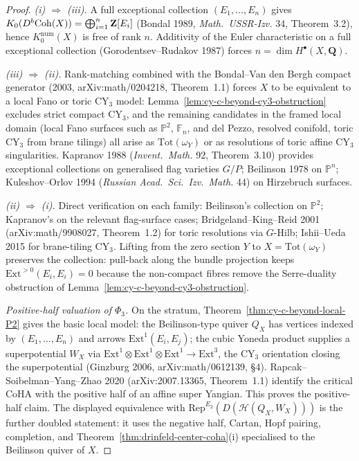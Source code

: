 \begin{proof}
\emph{(i) $\Rightarrow$ (iii).} A full exceptional collection
$(E_1, \ldots, E_n)$ gives $K_0(D^b\mathrm{Coh}(X)) = \bigoplus_{i=1}^n \mathbf{Z}[E_i]$
(Bondal 1989, \emph{Math.\ USSR-Izv.} 34, Theorem~3.2), hence
$K_0^{\mathrm{num}}(X)$ is free of rank $n$. Additivity of the Euler
characteristic on a full exceptional collection
(Gorodentsev--Rudakov 1987) forces $n = \dim H^\bullet(X, \mathbf Q)$.

\emph{(iii) $\Rightarrow$ (ii).} Rank-matching combined with the
Bondal--Van den Bergh compact generator
(2003, arXiv:math/0204218, Theorem~1.1) forces $X$ to be equivalent to a
local Fano or toric CY$_3$ model: Lemma~\ref{lem:cy-c-beyond-cy3-obstruction}
excludes strict compact CY$_3$, and the remaining candidates in the
framed local domain (local Fano surfaces such as $\mathbb P^2$, $\mathbb F_n$, and del Pezzo,
resolved conifold, toric CY$_3$ from brane tilings) all arise as
$\mathrm{Tot}(\omega_Y)$ or as resolutions of toric affine CY$_3$
singularities. Kapranov 1988 (\emph{Invent.\ Math.} 92,
Theorem~3.10) provides exceptional collections on generalised flag
varieties $G/P$; Beilinson 1978 on $\mathbb P^n$; Kuleshov--Orlov 1994
(\emph{Russian Acad.\ Sci.\ Izv.\ Math.} 44) on Hirzebruch surfaces.

\emph{(ii) $\Rightarrow$ (i).} Direct verification on each family:
Beilinson's collection on $\mathbb P^2$; Kapranov's on the relevant flag-surface cases;
Bridgeland--King--Reid 2001 (arXiv:math/9908027, Theorem~1.2) for toric
resolutions via $G$-Hilb; Ishii--Ueda 2015 for brane-tiling CY$_3$.
Lifting from the zero section $Y$ to $X = \mathrm{Tot}(\omega_Y)$
preserves the collection: pull-back along the bundle projection keeps
$\mathrm{Ext}^{>0}(E_i, E_i) = 0$ because the non-compact fibres remove
the Serre-duality obstruction of Lemma~\ref{lem:cy-c-beyond-cy3-obstruction}.

\emph{Positive-half valuation of $\Phi_3$.} On the stratum,
Theorem~\ref{thm:cy-c-beyond-local-P2} gives the basic local model: the
Beilinson-type quiver $Q_X$ has vertices indexed by $(E_1, \ldots, E_n)$
and arrows $\mathrm{Ext}^1(E_i, E_j)$; the cubic Yoneda product
supplies a superpotential $W_X$ via
$\mathrm{Ext}^1 \otimes \mathrm{Ext}^1 \otimes \mathrm{Ext}^1 \to \mathrm{Ext}^3$,
the CY$_3$ orientation closing the superpotential
(Ginzburg 2006, arXiv:math/0612139, \S 4). Rapcak--Soibelman--Yang--Zhao
2020 (arXiv:2007.13365, Theorem~1.1) identify the critical CoHA with the
positive half of an affine super Yangian. This proves the positive-half
claim. The displayed equivalence with
\(\mathrm{Rep}^{E_2}(D(\mathcal H(Q_X,W_X)))\) is the further doubled
statement: it uses the negative half, Cartan, Hopf pairing, completion,
and Theorem~\ref{thm:drinfeld-center-coha}(i) specialised to the
Beilinson quiver of \(X\).
\end{proof}

